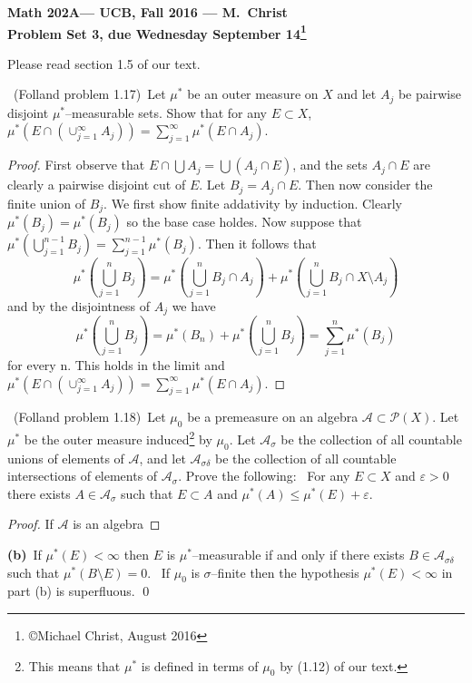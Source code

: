 \documentclass[11pt]{amsart}
\theoremstyle{definition}
\numberwithin{theorem}{section}
\numberwithin{definition}{section}
\numberwithin{equation}{section}
\def\eps{\varepsilon}
\def\scripta{{\mathcal A}}
\def\scriptp{{\mathcal P}}
\def\mustar{\mu^*}
\begin{document}
\begin{center}{\bf Math 202A--- UCB, Fall 2016 --- M.~Christ}
\\
{\bf Problem Set 3, due Wednesday September 14\footnote{\copyright{Michael Christ, August 2016}}}
\end{center}

Please read section 1.5 of our text. 

\medskip {}\ 
(Folland problem 1.17)\ 
Let $\mustar$ be an outer measure on $X$ and let $A_j$ be pairwise disjoint
$\mustar$--measurable sets. Show that for any $E\subset X$,
$\mustar(E\cap(\cup_{j=1}^\infty A_j)) = \sum_{j=1}^\infty \mustar(E\cap A_j)$.
\begin{proof}
	First observe that $E \cap \bigcup A_j = \bigcup (A_j \cap E)$, and the sets $A_j \cap E$ are clearly a pairwise disjoint cut of $E$. Let $B_j = A_j \cap E$. Then now consider the finite union of $B_j$. We first show finite addativity by induction. Clearly $\mu^*(B_j) = \mu^*(B_j)$ so the base case holdes. Now suppose that $\mu^*(\bigcup_{j=1}^{n-1}B_j) = \sum^{n-1}_{j=1} \mu^*(B_j)$. Then it follows that
	$$ \mu^*\left(\bigcup_{j=1}^n B_j\right) =\mu^*\left(\bigcup_{j=1}^n B_j\cap A_j\right) + \mu^*\left(\bigcup_{j=1}^n B_j \cap X \setminus A_j\right)$$
	and by the disjointness of $A_j$ we have \begin{equation*}
		\mu^*\left(\bigcup_{j=1}^n B_j\right) = \mu^*(B_n) + \mu^*\left(\bigcup_{j=1}^n B_j\right) = \sum^{n}_{j=1} \mu^*(B_j)
	\end{equation*}
	for every n. This holds in the limit and $\mustar(E\cap(\cup_{j=1}^\infty A_j)) = \sum_{j=1}^\infty \mustar(E\cap A_j)$.
\end{proof}

\medskip {}\ 
(Folland problem 1.18)\ 
Let $\mu_0$ be a premeasure on an algebra $\scripta\subset\scriptp(X)$.
Let $\mustar$ be the outer measure induced\footnote{This means that
$\mustar$ is defined in terms of $\mu_0$ by (1.12) of our text.} by $\mu_0$.
Let $\scripta_\sigma$ be the collection of all countable unions of elements
of $\scripta$, and let $\scripta_{\sigma\delta}$ be the collection of
all countable intersections of elements of $\scripta_\sigma$.
Prove the following:
\newline {\bf (a)}\
For any $E\subset X$ and $\eps>0$ there exists $A\in\scripta_\sigma$
such that $E\subset A$ and $\mustar(A)\le\mustar(E)+\eps$.
\begin{proof}
	If $\scripta$ is an algebra 
\end{proof}
{\bf (b)}\
If $\mustar(E)<\infty$ then $E$ is $\mustar$--measurable if and only if
there exists $B\in\scripta_{\sigma\delta}$ such that $\mustar(B\setminus E)=0$.
\
If $\mu_0$ is $\sigma$--finite then the hypothesis $\mustar(E)<\infty$
in part (b) is superfluous.
\qed
\end{document}
